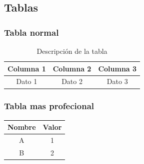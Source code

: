 
\subsection{Tablas}

\subsubsection{Tabla normal}

\begin{table}[H]
    \centering
    \begin{tabular}{|c|c|c|}
        \hline
        Columna 1 & Columna 2 & Columna 3 \\
        \hline
        Dato 1 & Dato 2 & Dato 3 \\
        \hline
    \end{tabular}
    \caption{Descripción de la tabla}
    \label{tab:etiqueta}
\end{table}

\subsubsection{Tabla mas profecional}

\begin{tabular}{cc}
  \toprule
  Nombre & Valor \\
  \midrule
  A & 1 \\
  B & 2 \\
  \bottomrule
\end{tabular}

